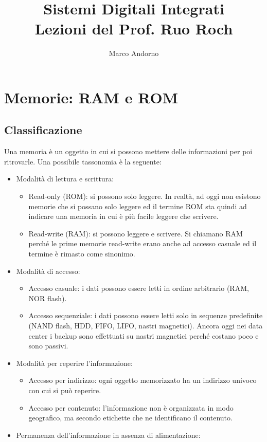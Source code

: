 \documentclass[11pt,4paper]{report}
\title{Sistemi Digitali Integrati \\ \large Lezioni del Prof. Ruo Roch}
\author{Marco Andorno}
\begin{document}
\maketitle
\tableofcontents
\chapter{Memorie: RAM e ROM}
\section{Classificazione}
Una memoria è un oggetto in cui si possono mettere delle informazioni per poi ritrovarle. Una possibile tassonomia è la seguente:
\begin{itemize}
	\item Modalità di lettura e scrittura:
	\begin{itemize}
		\item Read-only (ROM): si possono solo leggere. In realtà, ad oggi non esistono memorie che si possano solo leggere ed il termine ROM sta quindi ad indicare una memoria in cui è più facile leggere che scrivere.
		\item Read-write (RAM): si possono leggere e scrivere. Si chiamano RAM perché le prime memorie read-write erano anche ad accesso casuale ed il termine è rimasto come sinonimo.
	\end{itemize}
	\item Modalità di accesso:
	\begin{itemize}
		\item Accesso casuale: i dati possono essere letti in ordine arbitrario (RAM, NOR flash).
		\item Accesso sequenziale: i dati possono essere letti solo in sequenze predefinite (NAND flash, HDD, FIFO, LIFO, nastri magnetici). Ancora oggi nei data center i backup sono effettuati su nastri magnetici perché costano poco e sono passivi.
	\end{itemize}
	\item Modalità per reperire l'informazione:
	\begin{itemize}
		\item Accesso per indirizzo: ogni oggetto memorizzato ha un indirizzo univoco con cui si può reperire.
		\item Accesso per contenuto: l'informazione non è organizzata in modo geografico, ma secondo etichette che ne identificano il contenuto.
	\end{itemize}
	\item Permanenza dell'informazione in assenza di alimentazione:

\end{itemize}
\end{document}
